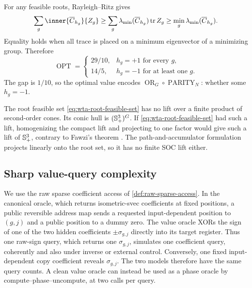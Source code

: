 For any feasible roots, Rayleigh--Ritz gives
\begin{equation}
 \sum_g\inner{\overline C_{h_g}}{Z_g}
 \ge\sum_g\lambda_{\min}(\overline C_{h_g})\tr Z_g
 \ge\min_g\lambda_{\min}(\overline C_{h_g}).
 \label{eq:wta-rayleigh-ritz}
\end{equation}
Equality holds when all trace is placed on a minimum eigenvector of a
minimizing group.  Therefore
\begin{equation}
 \boxed{\operatorname{OPT}=
 \begin{cases}
 29/10,&h_g=+1\text{ for every }g,\\
 14/5,&h_g=-1\text{ for at least one }g.
 \end{cases}}
 \label{eq:wta-optimum}
\end{equation}
The gap is $1/10$, so the optimal value encodes
$\operatorname{OR}_G\circ\operatorname{PARITY}_N$: whether some $h_g=-1$.

The root feasible set \eqref{eq:wta-root-feasible-set} has no lift over a
finite product of second-order cones.  Its conic hull is $(\mathbb{S}_{+}^3)^G$.  If
\eqref{eq:wta-root-feasible-set} had such a lift, homogenizing the compact lift and
projecting to one factor would give such a lift of $\mathbb{S}_{+}^3$, contrary to
Fawzi's theorem \cite{fawzi2018-on-representing-the-positive-semidefinite}.
The path-and-accumulator formulation projects linearly onto the root set, so
it has no finite SOC lift either.

\subsection{Sharp value-query complexity}
\label{sec:wta-query-complexity}

We use the raw sparse coefficient access of \cref{def:raw-sparse-access}.
In the canonical oracle, which returns isometric-svec coefficients at fixed
positions, a public reversible address map sends a requested
input-dependent position to $(g,j)$ and a public position to a dummy zero.
The value oracle XORs the sign of one of the two hidden coefficients
$\pm\sigma_{g,j}$ directly into its target register.  Thus one raw-sign query, which returns one $\sigma_{g,j}$, simulates
one coefficient query, coherently and also under inverse
or external control.  Conversely, one fixed input-dependent copy coefficient
reveals $\sigma_{g,j}$.  The two models
therefore have the same query counts.  A clean value oracle can
instead be used as a phase oracle by compute--phase--uncompute, at two calls
per query.

